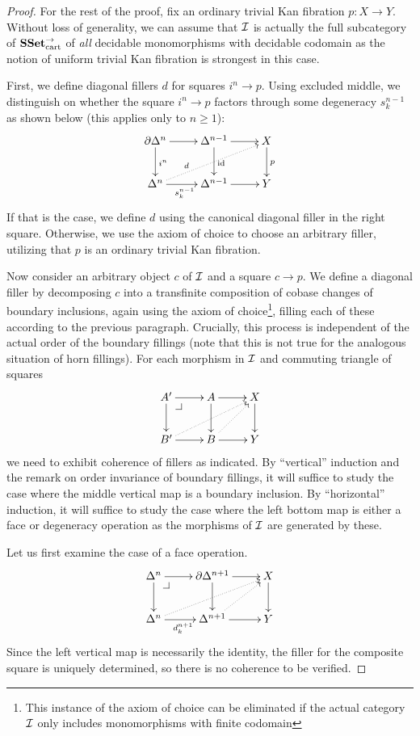 \documentclass[reqno,10pt,a4paper,oneside]{amsart}
\begin{document}
\begin{proof}
For the rest of the proof, fix an ordinary trivial Kan fibration $p : X \to Y$.
Without loss of generality, we can assume that $\cal{I}$ is actually the full subcategory of $\SSet_{\text{cart}}^{\to}$ of \emph{all} decidable monomorphisms with decidable codomain as the notion of uniform trivial Kan fibration is strongest in this case.

First, we define diagonal fillers $d$ for squares $i^n \to p$.
Using excluded middle, we distinguish on whether the square $i^n \to p$ factors through some degeneracy $s_k^{n-1}$ as shown below (this applies only to $n \geq 1$):
\[
\xymatrix{
  \partial \Delta^n
  \ar[r]
  \ar[d]^{i^n}
&
  \Delta^{n-1}
  \ar[r]
  \ar[d]^{\id}
&
  X
  \ar[d]^{p}
\\
  \Delta^n
  \ar[r]_{s_k^{n-1}}
  \ar@{.>}[urr]^(0.3){d}
&
  \Delta^{n-1}
  \ar[r]
&
  Y
}
\]
If that is the case, we define $d$ using the canonical diagonal filler in the right square.
Otherwise, we use the axiom of choice to choose an arbitrary filler, utilizing that $p$ is an ordinary trivial Kan fibration.

Now consider an arbitrary object $c$ of $\cal{I}$ and a square $c \to p$.
We define a diagonal filler by decomposing $c$ into a transfinite composition of cobase changes of boundary inclusions, again using the axiom of choice\footnote{This instance of the axiom of choice can be eliminated if the actual category $\cal{I}$ only includes monomorphisms with finite codomain}, filling each of these according to the previous paragraph.
Crucially, this process is independent of the actual order of the boundary fillings (note that this is not true for the analogous situation of horn fillings).
For each morphism in $\cal{I}$ and commuting triangle of squares
\[
\xymatrix{
  A'
  \ar[r]
  \ar[d]
  \pullback{dr}
&
  A
  \ar[d]
  \ar[r]
&
  X
  \ar[d]
\\
  B'
  \ar[r]
  \ar@{.>}[urr]
&
  B
  \ar[r]
  \ar@{.>}[ur]
&
  Y
}
\]
we need to exhibit coherence of fillers as indicated.
By ``vertical'' induction and the remark on order invariance of boundary fillings, it will suffice to study the case where the middle vertical map is a boundary inclusion.
By ``horizontal'' induction, it will suffice to study the case where the left bottom map is either a face or degeneracy operation as the morphisms of $\cal{I}$ are generated by these.

Let us first examine the case of a face operation.
\[
\xymatrix{
  \Delta^n
  \ar[r]
  \ar[d]
  \pullback{dr}
&
  \partial \Delta^{n+1}
  \ar[d]
  \ar[r]
&
  X
  \ar[d]
\\
  \Delta^n
  \ar[r]_{d_k^{n+1}}
  \ar@{.>}[urr]
&
  \Delta^{n+1}
  \ar[r]
  \ar@{.>}[ur]
&
  Y
}
\]
Since the left vertical map is necessarily the identity, the filler for the composite square is uniquely determined, so there is no coherence to be verified.


\end{proof}
\end{document}
